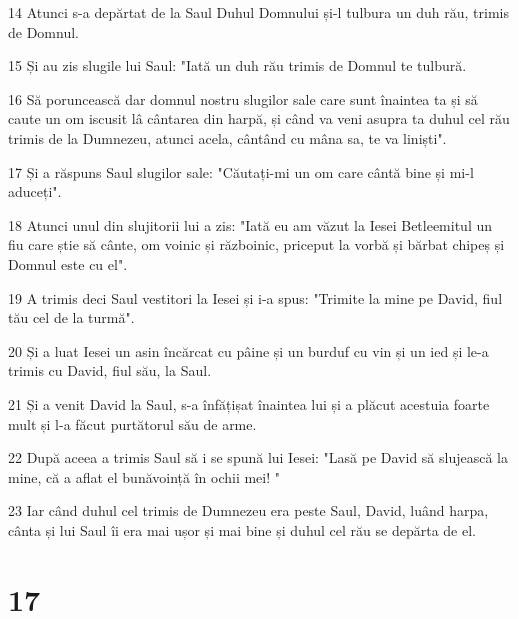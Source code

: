 \par 14 Atunci s-a depărtat de la Saul Duhul Domnului și-l tulbura un duh rău, trimis de Domnul.
\par 15 Și au zis slugile lui Saul: "Iată un duh rău trimis de Domnul te tulbură.
\par 16 Să poruncească dar domnul nostru slugilor sale care sunt înaintea ta și să caute un om iscusit lâ cântarea din harpă, și când va veni asupra ta duhul cel rău trimis de la Dumnezeu, atunci acela, cântând cu mâna sa, te va liniști".
\par 17 Și a răspuns Saul slugilor sale: "Căutați-mi un om care cântă bine și mi-l aduceți".
\par 18 Atunci unul din slujitorii lui a zis: "Iată eu am văzut la Iesei Betleemitul un fiu care știe să cânte, om voinic și războinic, priceput la vorbă și bărbat chipeș și Domnul este cu el".
\par 19 A trimis deci Saul vestitori la Iesei și i-a spus: "Trimite la mine pe David, fiul tău cel de la turmă".
\par 20 Și a luat Iesei un asin încărcat cu pâine și un burduf cu vin și un ied și le-a trimis cu David, fiul său, la Saul.
\par 21 Și a venit David la Saul, s-a înfățișat înaintea lui și a plăcut acestuia foarte mult și l-a făcut purtătorul său de arme.
\par 22 După aceea a trimis Saul să i se spună lui Iesei: "Lasă pe David să slujească la mine, că a aflat el bunăvoință în ochii mei! "
\par 23 Iar când duhul cel trimis de Dumnezeu era peste Saul, David, luând harpa, cânta și lui Saul îi era mai ușor și mai bine și duhul cel rău se depărta de el.

\chapter{17}

